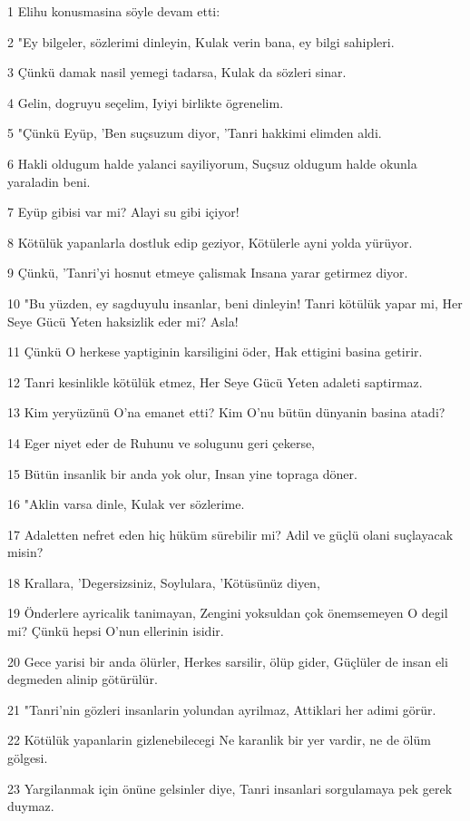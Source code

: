 \par 1 Elihu konusmasina söyle devam etti:
\par 2 "Ey bilgeler, sözlerimi dinleyin, Kulak verin bana, ey bilgi sahipleri.
\par 3 Çünkü damak nasil yemegi tadarsa, Kulak da sözleri sinar.
\par 4 Gelin, dogruyu seçelim, Iyiyi birlikte ögrenelim.
\par 5 "Çünkü Eyüp, 'Ben suçsuzum diyor, 'Tanri hakkimi elimden aldi.
\par 6 Hakli oldugum halde yalanci sayiliyorum, Suçsuz oldugum halde okunla yaraladin beni.
\par 7 Eyüp gibisi var mi? Alayi su gibi içiyor!
\par 8 Kötülük yapanlarla dostluk edip geziyor, Kötülerle ayni yolda yürüyor.
\par 9 Çünkü, 'Tanri'yi hosnut etmeye çalismak Insana yarar getirmez diyor.
\par 10 "Bu yüzden, ey sagduyulu insanlar, beni dinleyin! Tanri kötülük yapar mi, Her Seye Gücü Yeten haksizlik eder mi? Asla!
\par 11 Çünkü O herkese yaptiginin karsiligini öder, Hak ettigini basina getirir.
\par 12 Tanri kesinlikle kötülük etmez, Her Seye Gücü Yeten adaleti saptirmaz.
\par 13 Kim yeryüzünü O'na emanet etti? Kim O'nu bütün dünyanin basina atadi?
\par 14 Eger niyet eder de Ruhunu ve solugunu geri çekerse,
\par 15 Bütün insanlik bir anda yok olur, Insan yine topraga döner.
\par 16 "Aklin varsa dinle, Kulak ver sözlerime.
\par 17 Adaletten nefret eden hiç hüküm sürebilir mi? Adil ve güçlü olani suçlayacak misin?
\par 18 Krallara, 'Degersizsiniz, Soylulara, 'Kötüsünüz diyen,
\par 19 Önderlere ayricalik tanimayan, Zengini yoksuldan çok önemsemeyen O degil mi? Çünkü hepsi O'nun ellerinin isidir.
\par 20 Gece yarisi bir anda ölürler, Herkes sarsilir, ölüp gider, Güçlüler de insan eli degmeden alinip götürülür.
\par 21 "Tanri'nin gözleri insanlarin yolundan ayrilmaz, Attiklari her adimi görür.
\par 22 Kötülük yapanlarin gizlenebilecegi Ne karanlik bir yer vardir, ne de ölüm gölgesi.
\par 23 Yargilanmak için önüne gelsinler diye, Tanri insanlari sorgulamaya pek gerek duymaz.
